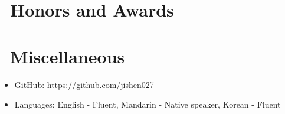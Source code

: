 \documentclass{resume}
\begin{document}
\section{\faHeartO\ Honors and Awards}

\section{\faInfo\ Miscellaneous}
\begin{itemize}[parsep=0.5ex]
  \item GitHub: https://github.com/jishen027
  \item Languages: English - Fluent, Mandarin - Native speaker, Korean - Fluent
\end{itemize}

%
%
\end{document}
